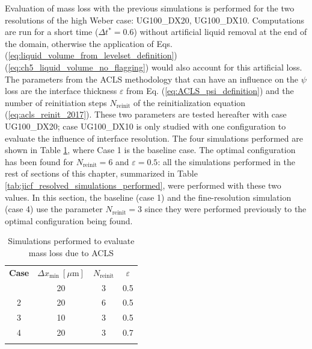 Evaluation of mass loss with the previous simulations is performed for the two resolutions of the high Weber case: UG100\_DX20, UG100\_DX10. Computations are run for a short time ($\Delta t^* = 0.6$) without artificial liquid removal at the end of the domain, otherwise the application of Eqs. (\ref{eq:liquid_volume_from_levelset_definition}) (\ref{eq:ch5_liquid_volume_no_flagging}) would also account for this artificial loss. The parameters from the ACLS methodology that can have an influence on the $\psi$ loss are the interface thickness $\varepsilon$ from Eq. (\ref{eq:ACLS_psi_definition}) and the number of reinitiation steps $N_\mathrm{reinit}$ of the reinitialization equation (\ref{eq:acls_reinit_2017}). These two parameters are tested hereafter with case UG100\_DX20; case UG100\_DX10 is only studied with one configuration to evaluate the influence of interface resolution. The four simulations performed are shown in Table \ref{tab:jicf_simulations_mass_loss_set_levelset_band}, where Case 1 is the baseline case. The optimal configuration has been found for $N_\mathrm{reinit} = 6$  and $\varepsilon = 0.5$: all the simulations performed in the rest of sections of this chapter, summarized in Table \ref{tab:jicf_resolved_simulations_performed}, were performed with these two values. In this section, the baseline (case 1) and the fine-resolution simulation (case 4) use the parameter $N_\mathrm{reinit} = 3$ since they were performed previously to the optimal configuration being found.

\begin{table}[!h]
\centering
\caption{Simulations performed to evaluate mass loss due to ACLS}
\begin{tabular}{cccc}
\thickhline
\textbf{Case} & $\Delta x_\mathrm{min} ~ [\mu \mathrm{m}]$ & $N_\mathrm{reinit}$ &  $\varepsilon$ \\
\thickhline
1 & 20 & 3 & 0.5 \\
2 & 20 & 6 & 0.5 \\
3 & 10 & 3 & 0.5 \\
4 & 20 & 3 & 0.7 \\
\thickhline
\end{tabular}
\label{tab:jicf_simulations_mass_loss_set_levelset_band}
\end{table}

%

